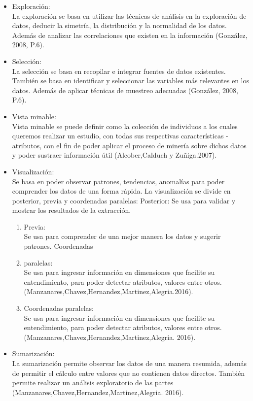 \documentclass[journal]{IEEEtran}
\begin{document}
\begin{itemize}
\item Exploración: \\
La exploración se basa en utilizar las técnicas de análisis en la exploración de datos, deducir la simetría, la distribución y la normalidad de los datos. Además de analizar las correlaciones que existen en la información (González, 2008, P.6).
\item Selección:\\  
La selección se basa en recopilar e integrar fuentes de datos existentes. También se basa en identificar y seleccionar las variables más relevantes en los datos. Además de aplicar técnicas de muestreo adecuadas (González, 2008, P.6).
\item Vista minable: \\
Vista minable se puede definir como la colección de individuos a los cuales queremos realizar un estudio, con todas sus respectivas características - atributos, con el fin de poder aplicar el proceso de minería sobre dichos datos y poder sustraer información útil (Alcober,Calduch y Zuñiga.2007).
\item Visualización:\\ 
Se basa en poder observar patrones, tendencias, anomalías para poder comprender los datos de una forma rápida.
La visualización se divide en posterior, previa y coordenadas paralelas:
Posterior: Se usa para validar y mostrar los resultados de la extracción. 
\begin{enumerate}
\item Previa: \\
Se usa para comprender de una mejor manera los datos y sugerir patrones.
Coordenadas 
\item paralelas: \\
Se usa para ingresar información en dimensiones que facilite su entendimiento, para poder detectar atributos, valores entre otros. 
(Manzanares,Chavez,Hernandez,Martinez,Alegria.2016).
\item Coordenadas paralelas: \\
Se usa para ingresar información en dimensiones que facilite su entendimiento, para poder detectar atributos, valores entre otros. 
(Manzanares,Chavez,Hernandez,Martinez,Alegria. 2016).
\end{enumerate}
\item Sumarización: \\
La sumarización permite observar los datos de una manera resumida, además de permitir el cálculo entre valores que no contienen datos directos. También permite realizar un análisis exploratorio de las partes (Manzanares,Chavez,Hernandez,Martinez,Alegria. 2016).

\end{itemize}
\end{document}
